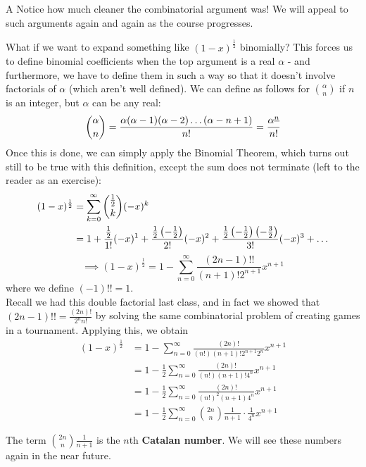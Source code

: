 \begin{reflection}{A}
Notice how much cleaner the combinatorial argument was! We will appeal to such arguments again and again as the course progresses.
\end{reflection}
What if we want to expand something like $(1-x)^{\frac{1}{2}}$ binomially? This forces us to define binomial coefficients when the top argument is a real $\alpha$ - and furthermore, we have to define them in such a way so that it doesn't involve factorials of $\alpha$ (which aren't well defined). We can define as follows for $\binom{\alpha}{n}$ if $n$ is an integer, but $\alpha$ can be any real: 
\[
	\binom{\alpha}{n} =  \frac{\alpha (\alpha - 1) (\alpha - 2) \ldots (\alpha - n + 1)}{n! } = \frac{{\alpha}^{\underline{n}}}{n!}
\]
Once this is done, we can simply apply the Binomial Theorem, which turns out still to be true with this definition, except the sum does not terminate (left to the reader as an exercise): 
\begin{align*}
(1-x)^{\frac{1}{2}} &= \sum_{k=0}^{\infty} \binom{\frac{1}{2}}{k} (-x)^k \\
&= 1 + \frac{\frac{1}{2}}{1!}(-x)^1 + \frac{\frac{1}{2} \left(-\frac{1}{2} \right)}{2!} (-x)^2 + \frac{\frac{1}{2} \left(-\frac{1}{2} \right) \left(-\frac{3}{2} \right)}{3!} (-x)^3  + \ldots 
\end{align*}
\[
\implies (1-x)^{\frac{1}{2}} = 1 - \sum_{n=0}^{\infty} \frac{(2n-1)!!}{(n+1)!2^{n+1}} x^{n+1}	
\]
where we define $(-1)!! = 1$. \\
Recall we had this double factorial last class, and in fact we showed that $(2n-1)!! = \frac{(2n)!}{2^n n!}$ by solving the same combinatorial problem of creating games in a tournament. Applying this, we obtain
\begin{align*}
(1-x)^{\frac{1}{2}} &= 1 - \sum_{n=0}^{\infty} \frac{(2n)!}{(n!)(n+1)!2^{n+1}2^n} x^{n+1}	\\
&= 1 - \frac{1}{2}\sum_{n=0}^{\infty} \frac{(2n)!}{(n!)(n+1)! 4^{n}} x^{n+1} \\
&= 1 - \frac{1}{2}\sum_{n=0}^{\infty} \frac{(2n)!}{(n!)^2(n+1) 4^{n}} x^{n+1}\\
&=  1 - \frac{1}{2}\sum_{n=0}^{\infty} \binom{2n}{n} \frac{1}{n+1}\cdot \frac{1}{4^n} x^{n+1}
\end{align*}
\begin{remark}
The term $\binom{2n}{n} \frac{1}{n+1}$ is the $n$th \textbf{Catalan number}. We will see these numbers again in the near future. 
\end{remark}


